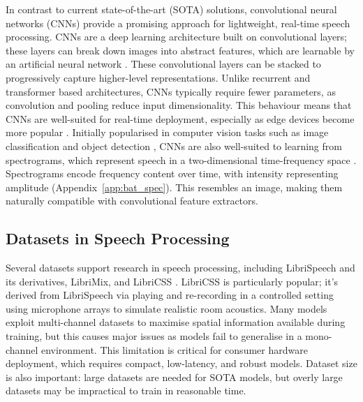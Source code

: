 In contrast to current state-of-the-art (SOTA) solutions, convolutional neural networks (CNNs) \cite{cnn} provide a promising approach for lightweight, real-time speech processing. CNNs are a deep learning architecture built on convolutional layers; these layers can break down images into abstract features, which are learnable by an artificial neural network \cite{IBM_CNN}. These convolutional layers can be stacked to progressively capture higher-level representations. Unlike recurrent and transformer based architectures, CNNs typically require fewer parameters, as convolution and pooling reduce input dimensionality. This behaviour means that CNNs are well-suited for real-time deployment, especially as edge devices become more popular \cite{edgecomputing}. Initially popularised in computer vision tasks such as image classification and object detection \cite{cnn_other_uses}, CNNs are also well-suited to learning from spectrograms, which represent speech in a two-dimensional time-frequency space \cite{specs_and_cnns}. Spectrograms encode frequency content over time, with intensity representing amplitude (Appendix~\ref{app:bat_spec}). This resembles an image, making them naturally compatible with convolutional feature extractors.\newline



\subsection{Datasets in Speech Processing}
Several datasets support research in speech processing, including LibriSpeech and its derivatives, LibriMix, and LibriCSS \cite{libricss}. LibriCSS is particularly popular; it's derived from LibriSpeech via playing and re-recording in a controlled setting using microphone arrays to simulate realistic room acoustics. Many models exploit multi-channel datasets to maximise spatial information available during training, but this causes major issues as models fail to generalise in a mono-channel environment. This limitation is critical for consumer hardware deployment, which requires compact, low-latency, and robust models. Dataset size is also important: large datasets are needed for SOTA models, but overly large datasets may be impractical to train in reasonable time.


